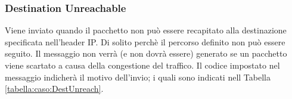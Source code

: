 \subsubsection*{Destination Unreachable} 
Viene inviato quando il pacchetto non può essere recapitato alla destinazione specificata nell'header IP. 
Di solito perchè il percorso definito non può essere seguito. 
Il messaggio non verrà (e non dovrà essere) generato se un pacchetto viene scartato a causa della congestione del traffico. 
Il codice impostato nel messaggio indicherà il motivo dell'invio; 
i quali sono indicati nell Tabella \ref{tabella:caso:DestUnreach}.
